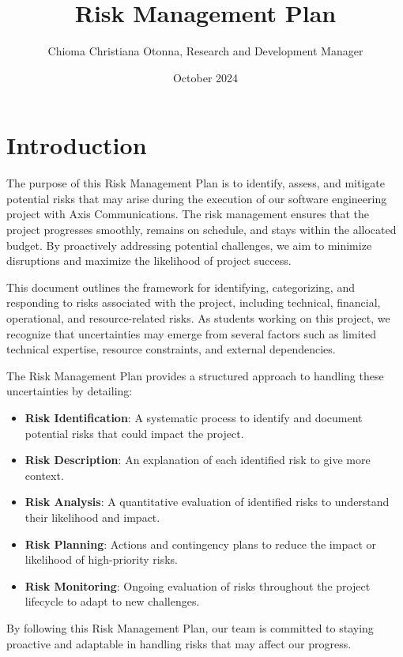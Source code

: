 \documentclass{article}
\title{Risk Management Plan}
\author{Chioma Christiana Otonna, Research and Development Manager}
\date{October 2024}
\begin{document}
\maketitle

\newpage
 


\newpage
\section{Introduction}
The purpose of this Risk Management Plan is to identify, assess, and mitigate potential risks that may arise during the execution of our software engineering project with Axis Communications. The risk management ensures that the project progresses smoothly, remains on schedule, and stays within the allocated budget. By proactively addressing potential challenges, we aim to minimize disruptions and maximize the likelihood of project success.

This document outlines the framework for identifying, categorizing, and responding to risks associated with the project, including technical, financial, operational, and resource-related risks. As students working on this project, we recognize that uncertainties may emerge from several factors such as limited technical expertise, resource constraints, and external dependencies.

The Risk Management Plan provides a structured approach to handling these uncertainties by detailing:
\begin{itemize}
    \item \textbf{Risk Identification}: A systematic process to identify and document potential risks that could impact the project.
    \item \textbf{Risk Description}: An explanation of each identified risk to give more context.
    \item \textbf{Risk Analysis}: A quantitative evaluation of identified risks to understand their likelihood and impact.
    \item \textbf{Risk Planning}: Actions and contingency plans to reduce the impact or likelihood of high-priority risks.
    \item \textbf{Risk Monitoring}: Ongoing evaluation of risks throughout the project lifecycle to adapt to new challenges.
\end{itemize}

\tableofcontents

By following this Risk Management Plan, our team is committed to staying proactive and adaptable in handling risks that may affect our progress.
\pagebreak
\end{document}
